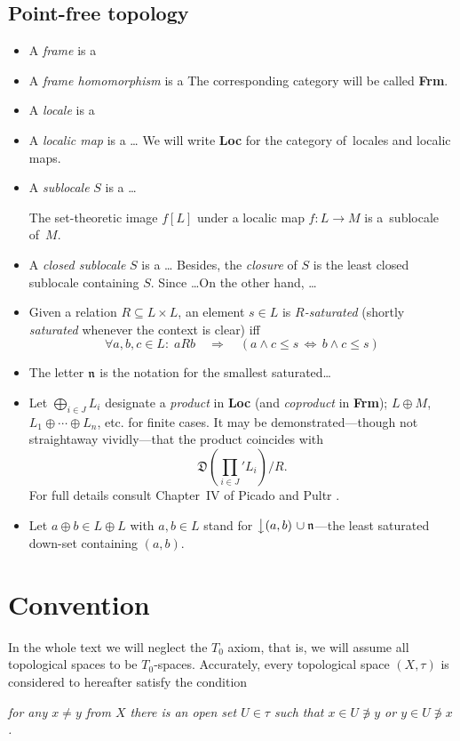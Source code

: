 \subsection*{Point-free topology}

\begin{itemize}
\item A \emph{frame} is a
\item A \emph{frame homomorphism} is a
The corresponding category will be called {\bf Frm}.
\item A \emph{locale} is a
\item A \emph{localic map} is a \ldots
We will write {\bf Loc} for the category of~locales and localic maps.
\item A \emph{sublocale} $S$ is a \ldots
  \begin{fact}
    The set-theoretic image $f[L]$ under a localic map $f\colon L\to M$
    is a~sublocale of~$M$.
  \end{fact}
\item A \emph{closed sublocale} $S$ is a \ldots
Besides, the \emph{closure} of $S$ is the least closed sublocale containing $S$.
Since \ldots On the other hand, \ldots
\item Given a relation $R\subseteq L \times L$, an element $s\in L$ is
\emph{$R$-saturated} (shortly \emph{saturated} whenever the context is clear)
  iff
\[
  \forall a, b, c\in L: \; aRb \quad \Rightarrow \quad \left( a \wedge c \leq s
  \, \Leftrightarrow \, b \wedge c \leq s \right)
\]
\item The letter $\mathfrak{n}$ is the notation for the smallest saturated\ldots
\item Let $\bigoplus_{i\in J} L_i$ designate a \emph{product} in {\bf Loc} (and
\emph{coproduct} in {\bf Frm}); $L \oplus M$, $L_1 \oplus\cdots\oplus L_n$, etc.
for finite cases.
It may be demonstrated---though not straightaway vividly---that the product
coincides with
\[
  \textstyle\mathfrak{D}\left(\prod_{i\in J}\nolimits' L_{i}\right)/R.
\]
For full details consult Chapter~IV of Picado and Pultr \cite{picado-pultr12}.
\item Let $a \oplus b \in L \oplus L$ with $a, b\in L$ stand for
$\left\downarrow (a, b) \right. \cup \mathfrak{n}$---the least saturated down-set
containing $(a, b)$.
\end{itemize}

\section*{Convention}

In the whole text we will neglect the $T_0$ axiom, that is, we will assume all
topological spaces to be $T_0$-spaces.
Accurately, every topological space $(X, \tau)$ is considered to hereafter
satisfy the condition
\begin{center} \it
  for any $x \ne y$ from $X$ there is an open set $U \in \tau$ such that $x \in U
  \not\owns y$ or $y \in U \not\owns x$.
\end{center}
